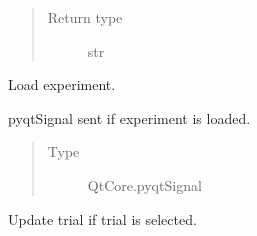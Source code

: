 \documentclass[letterpaper,10pt,english]{sphinxmanual}
\begin{document}
\begin{fulllineitems}
\begin{fulllineitems}
\begin{quote}
\begin{description}
\item[{Return type}] \leavevmode
\sphinxAtStartPar
str

\end{description}\end{quote}

\end{fulllineitems}


\begin{fulllineitems}
\label{\detokenize{NoSeMazeController/main:main.MainApp.load_experiment}}
\pysigstartsignatures
{}
\pysigstopsignatures
\sphinxAtStartPar
Load experiment.

\end{fulllineitems}


\begin{fulllineitems}
\label{\detokenize{NoSeMazeController/main:main.MainApp.loaded}}
\pysigstartsignatures
{}
\pysigstopsignatures
\sphinxAtStartPar
pyqtSignal sent if experiment is loaded.
\begin{quote}\begin{description}
\item[{Type}] \leavevmode
\sphinxAtStartPar
QtCore.pyqtSignal

\end{description}\end{quote}

\end{fulllineitems}


\begin{fulllineitems}
\label{\detokenize{NoSeMazeController/main:main.MainApp.on_trial_selected}}
\pysigstartsignatures
{}
\pysigstopsignatures
\sphinxAtStartPar
Update trial if trial is selected.

\end{fulllineitems}



\end{fulllineitems}
\end{document}
